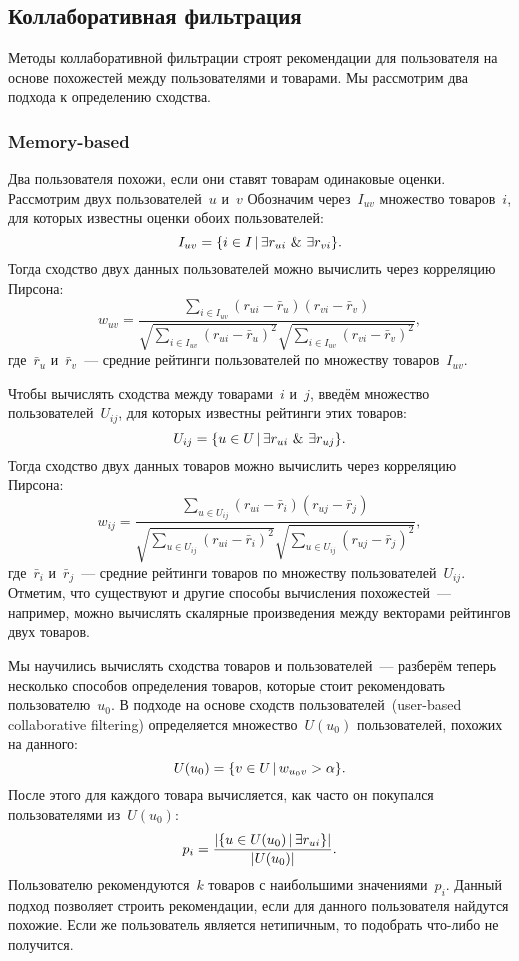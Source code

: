 \documentclass[12pt,fleqn]{article}
\begin{document}
\subsection{Коллаборативная фильтрация}
Методы коллаборативной фильтрации строят рекомендации для пользователя на основе
похожестей между пользователями и товарами.
Мы рассмотрим два подхода к определению сходства.

\subsubsection{Memory-based}
Два пользователя похожи, если они ставят товарам одинаковые оценки.
Рассмотрим двух пользователей~$u$ и~$v$
Обозначим через~$I_{uv}$ множество товаров~$i$, для которых известны
оценки обоих пользователей:
\[
    I_{uv}
    =
    \{
        i \in I
        \cond
        \exists r_{ui}
        \ \&\ 
        \exists r_{vi}
    \}.
\]
Тогда сходство двух данных пользователей можно вычислить через корреляцию Пирсона:
\[
    w_{uv}
    =
    \frac{
        \sum_{i \in I_{uv}}
            (r_{ui} - \bar r_u)
            (r_{vi} - \bar r_v)
    }{
        \sqrt{
        \sum_{i \in I_{uv}}
            (r_{ui} - \bar r_u)^2
        }
        \sqrt{
        \sum_{i \in I_{uv}}
            (r_{vi} - \bar r_v)^2
        }
    },
\]
где~$\bar r_u$ и~$\bar r_v$~--- средние рейтинги пользователей по множеству товаров~$I_{uv}$.

Чтобы вычислять сходства между товарами~$i$ и~$j$, введём множество пользователей~$U_{ij}$,
для которых известны рейтинги этих товаров:
\[
    U_{ij}
    =
    \{
        u \in U
        \cond
        \exists r_{ui}
        \ \&\ 
        \exists r_{uj}
    \}.
\]
Тогда сходство двух данных товаров можно вычислить через корреляцию Пирсона:
\[
    w_{ij}
    =
    \frac{
        \sum_{u \in U_{ij}}
            (r_{ui} - \bar r_i)
            (r_{uj} - \bar r_j)
    }{
        \sqrt{
        \sum_{u \in U_{ij}}
            (r_{ui} - \bar r_i)^2
        }
        \sqrt{
        \sum_{u \in U_{ij}}
            (r_{uj} - \bar r_j)^2
        }
    },
\]
где~$\bar r_i$ и~$\bar r_j$~--- средние рейтинги товаров по множеству пользователей~$U_{ij}$.
Отметим, что существуют и другие способы вычисления похожестей~---
например, можно вычислять скалярные произведения между векторами рейтингов двух товаров.

Мы научились вычислять сходства товаров и пользователей~---
разберём теперь несколько способов определения товаров, которые стоит
рекомендовать пользователю~$u_0$.
В подходе на основе сходств пользователей~(user-based collaborative filtering)
определяется множество~$U(u_0)$ пользователей, похожих на данного:
\[
    U(u_0)
    =
    \{v \in U
        \mspace{3mu}{|}\mspace{3mu}
        w_{u_0 v} > \alpha
    \}.
\]
После этого для каждого товара вычисляется, как часто он покупался пользователями из~$U(u_0)$:
\[
    p_{i}
    =
    \frac{
        |\{u \in U(u_0) \mspace{3mu}{|}\mspace{3mu} \exists r_{ui}\}|
    }{
        |U(u_0)|
    }.
\]
Пользователю рекомендуются~$k$ товаров с наибольшими значениями~$p_i$.
Данный подход позволяет строить рекомендации, если для данного пользователя найдутся похожие.
Если же пользователь является нетипичным, то подобрать что-либо не получится.
\end{document}
